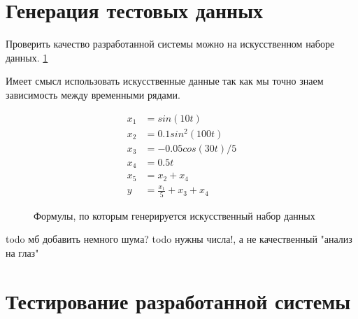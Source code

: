 

\section{Генерация тестовых данных}

Проверить качество разработанной системы можно на искусственном наборе
данных. \ref{pic:example_data_formulas}

Имеет смысл использовать искусственные данные так как мы точно знаем
зависимость между временными рядами.

\def\figurename{Формулы}
\begin{figure}[t]
	\begin{center}
	\begin{align*}
		x_1 &= sin(10t) \\
		x_2 &= 0.1 sin^2(100t) \\
		x_3 &= -0.05 cos(30t)/5 \\
		x_4 &= 0.5 t \\
		x_5 &= x_2 + x_4\\
		y   &= \frac{x_1}{5} + x_3 + x_4
	\end{align*}
	\end{center}
	\caption{Формулы, по которым генерируется искусственный набор данных}
	\label{pic:example_data_formulas}
\end{figure}
\noindent

todo мб добавить немного шума?
todo нужны числа!, а не качественный "анализ на глаз"

\section{Тестирование разработанной системы}

